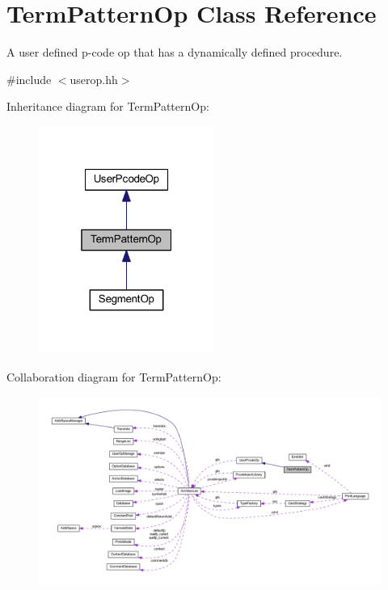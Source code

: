 \hypertarget{class_term_pattern_op}{}\section{Term\+Pattern\+Op Class Reference}
\label{class_term_pattern_op}


A user defined p-\/code op that has a dynamically defined procedure.  




{\ttfamily \#include $<$userop.\+hh$>$}



Inheritance diagram for Term\+Pattern\+Op\+:
\nopagebreak
\begin{figure}[H]
\begin{center}
\leavevmode
\includegraphics[width=163pt]{class_term_pattern_op__inherit__graph}
\end{center}
\end{figure}


Collaboration diagram for Term\+Pattern\+Op\+:
\nopagebreak
\begin{figure}[H]
\begin{center}
\leavevmode
\includegraphics[width=350pt]{class_term_pattern_op__coll__graph}
\end{center}
\end{figure}
